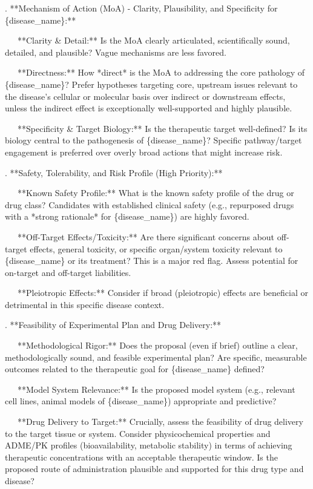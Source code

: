 \documentclass{article}
\begin{document}
\begin{tcolorbox}
.  **Mechanism of Action (MoA) - Clarity, Plausibility, and Specificity for \{disease\_name\}:**

\quad \quad *\ \ \ **Clarity \&{} Detail:** Is the MoA clearly articulated, scientifically sound, detailed, and plausible? Vague mechanisms are less favored.

\quad \quad *\ \ \ **Directness:** How *direct* is the MoA to addressing the core pathology of \{disease\_name\}? Prefer hypotheses targeting core, upstream issues relevant to the disease's cellular or molecular basis over indirect or downstream effects, unless the indirect effect is exceptionally well-supported and highly plausible.

\quad \quad *\ \ \ **Specificity \&{} Target Biology:** Is the therapeutic target well-defined? Is its biology central to the pathogenesis of \{disease\_name\}? Specific pathway/target engagement is preferred over overly broad actions that might increase risk.

.  **Safety, Tolerability, and Risk Profile (High Priority):**

\quad \quad *\ \ \ **Known Safety Profile:** What is the known safety profile of the drug or drug class? Candidates with established clinical safety (e.g., repurposed drugs with a *strong rationale* for \{disease\_name\}) are highly favored.

\quad \quad *\ \ \ **Off-Target Effects/Toxicity:** Are there significant concerns about off-target effects, general toxicity, or specific organ/system toxicity relevant to \{disease\_name\} or its treatment? This is a major red flag. Assess potential for on-target and off-target liabilities.

\quad \quad *\ \ \ **Pleiotropic Effects:** Consider if broad (pleiotropic) effects are beneficial or detrimental in this specific disease context.

.  **Feasibility of Experimental Plan and Drug Delivery:**

\quad \quad *\ \ \ **Methodological Rigor:** Does the proposal (even if brief) outline a clear, methodologically sound, and feasible experimental plan? Are specific, measurable outcomes related to the therapeutic goal for \{disease\_name\} defined?

\quad \quad *\ \ \ **Model System Relevance:** Is the proposed model system (e.g., relevant cell lines, animal models of \{disease\_name\}) appropriate and predictive?

\quad \quad *\ \ \ **Drug Delivery to Target:** Crucially, assess the feasibility of drug delivery to the target tissue or system. Consider physicochemical properties and ADME/PK profiles (bioavailability, metabolic stability) in terms of achieving therapeutic concentrations with an acceptable therapeutic window. Is the proposed route of administration plausible and supported for this drug type and disease?


\end{tcolorbox}
\end{document}
